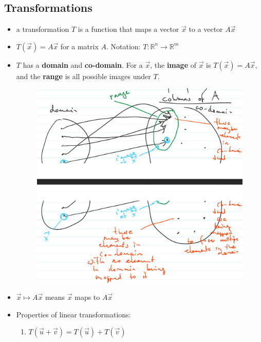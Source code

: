 \documentclass[a4paper,12pt]{article}
\theoremstyle{definition}
\theoremstyle{definition}
\begin{document}
	\subsection{Transformations}
	\begin{itemize}
		\item a transformation $T$ is a function that maps a vector $\vec{x}$ to a vector $A\vec{x}$
		
		\item $T(\vec{x}) = A\vec{x}$ for a matrix $A$. Notation: $T: \mathbb{R}^n \rightarrow \mathbb{R}^m$
		
		\item $T$ has a \textbf{domain} and \textbf{co-domain}. For a $\vec{x}$, the \textbf{image} of $\vec{x}$ is $T(\vec{x}) = A\vec{x}$, and the \textbf{range} is all possible images under $T$.
		
		\begin{figure}[h!]
			\includegraphics[width=0.5\paperwidth, center]{images/lin-transforms-diagram.PNG}
		\end{figure}
		
		\item $\vec{x} \mapsto A\vec{x}$ means $\vec{x}$ maps to $A\vec{x}$
		
		\item Properties of linear transformations:
		\begin{enumerate}
			\item $T(\vec{u} + \vec{v}) = T(\vec{u}) + T(\vec{v})$
			

\end{enumerate}
\end{itemize}
\end{document}
